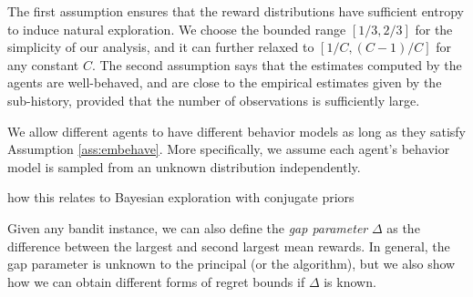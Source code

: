 The first assumption ensures that the reward distributions have
sufficient entropy to induce natural exploration. We choose the
bounded range $[1/3, 2/3]$ for the simplicity of our analysis, and it
can further relaxed to $[1/C, (C-1)/C]$ for any constant $C$. The
second assumption says that the estimates computed by the agents are
well-behaved, and are close to the empirical estimates given by the
sub-history, provided that the number of observations is sufficiently
large.


We allow different agents to have different behavior models as long as
they satisfy Assumption \ref{ass:embehave}. More specifically, we
assume each agent's behavior model is sampled from an unknown
distribution independently.
\begin{remark}
  how this relates to Bayesian exploration with conjugate
  priors
\end{remark}

Given any bandit instance, we can also define the \emph{gap parameter}
$\Delta$ as the difference between the largest and second largest mean
rewards. In general, the gap parameter is unknown to the principal (or
the algorithm), but we also show how we can obtain different forms of
regret bounds if $\Delta$ is known.




